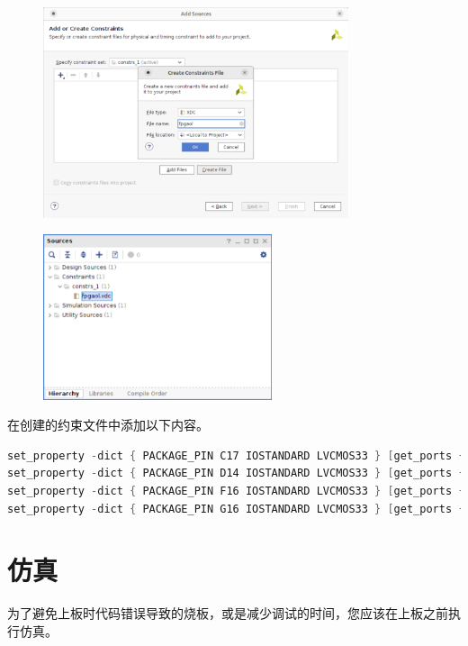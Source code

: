 \documentclass{ctexart}
\begin{document}
\begin{figure}[H]
    \centering
    \includegraphics[width=0.8\textwidth]{lab0/19.png}
\end{figure}

\begin{figure}[H]
    \centering
    \includegraphics[width=0.6\textwidth]{lab0/20.png}
\end{figure}

在创建的约束文件中添加以下内容。

\begin{lstlisting}[language=Verilog]
set_property -dict { PACKAGE_PIN C17 IOSTANDARD LVCMOS33 } [get_ports { s }];
set_property -dict { PACKAGE_PIN D14 IOSTANDARD LVCMOS33 } [get_ports { a }];
set_property -dict { PACKAGE_PIN F16 IOSTANDARD LVCMOS33 } [get_ports { b }];
set_property -dict { PACKAGE_PIN G16 IOSTANDARD LVCMOS33 } [get_ports { c }];
\end{lstlisting}


\section{仿真}

为了避免上板时代码错误导致的烧板，或是减少调试的时间，您应该在上板之前执行仿真。
\end{document}

